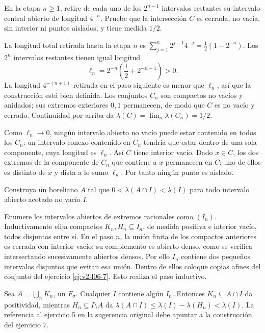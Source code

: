 \begin{ejercicio}\label{ej:v2-l06-7}
En la etapa $n\ge1$, retire de cada uno de los $2^{n-1}$ intervalos restantes su intervalo central abierto de longitud $4^{-n}$. Pruebe que la intersección $C$ es cerrada, no vacía, sin interior ni puntos aislados, y tiene medida $1/2$.
\end{ejercicio}
\begin{solucion}
La longitud total retirada hasta la etapa $n$ es $\sum_{j=1}^n2^{j-1}4^{-j}=\frac12(1-2^{-n})$. Los $2^n$ intervalos restantes tienen igual longitud
\[\ell_n=2^{-n}\left(\frac12+2^{-n-1}\right)>0.\]
La longitud $4^{-(n+1)}$ retirada en el paso siguiente es menor que $\ell_n$, así que la construcción está bien definida. Los conjuntos $C_n$ son compactos no vacíos y anidados; sus extremos exteriores $0,1$ permanecen, de modo que $C$ es no vacío y cerrado. Continuidad por arriba da $\lambda(C)=\lim_n\lambda(C_n)=1/2$.

Como $\ell_n\to0$, ningún intervalo abierto no vacío puede estar contenido en todos los $C_n$: un intervalo conexo contenido en $C_n$ tendría que estar dentro de una sola componente, cuya longitud es $\ell_n$. Así $C$ tiene interior vacío. Dado $x\in C$, los dos extremos de la componente de $C_n$ que contiene a $x$ permanecen en $C$; uno de ellos es distinto de $x$ y dista a lo sumo $\ell_n$. Por tanto ningún punto es aislado.
\end{solucion}

\begin{ejercicio}\label{ej:v2-l06-8}
Construya un boreliano $A$ tal que $0<\lambda(A\cap I)<\lambda(I)$ para todo intervalo abierto acotado no vacío $I$.
\end{ejercicio}
\begin{solucion}
Enumere los intervalos abiertos de extremos racionales como $(I_n)$. Inductivamente elija compactos $K_n,H_n\subseteq I_n$, de medida positiva e interior vacío, todos disjuntos entre sí. En el paso $n$, la unión finita de los compactos anteriores es cerrada con interior vacío: su complemento es abierto denso, como se verifica intersectando sucesivamente abiertos densos. Por ello $I_n$ contiene dos pequeños intervalos disjuntos que evitan esa unión. Dentro de ellos coloque copias afines del conjunto del ejercicio \ref{ej:v2-l06-7}. Esto realiza el paso inductivo.

Sea $A=\bigcup_nK_n$, un $F_\sigma$. Cualquier $I$ contiene algún $I_n$. Entonces $K_n\subseteq A\cap I$ da positividad, mientras $H_n\subseteq I\setminus A$ da $\lambda(A\cap I)\le\lambda(I)-\lambda(H_n)<\lambda(I)$. La referencia al ejercicio 5 en la sugerencia original debe apuntar a la construcción del ejercicio 7.
\end{solucion}

